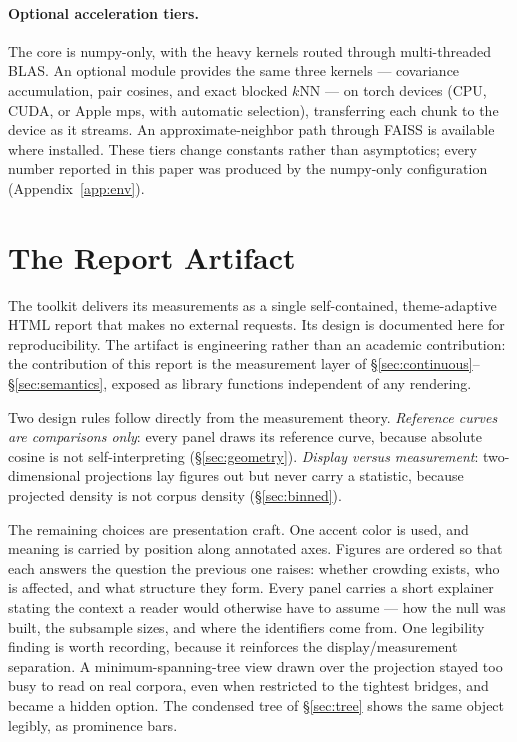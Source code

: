 \documentclass[11pt,letterpaper]{article}
\begin{document}
\paragraph{Optional acceleration tiers.}
The core is \textsf{numpy}-only, with the heavy kernels routed through
multi-threaded BLAS. An optional module provides the same three kernels
--- covariance accumulation, pair cosines, and exact blocked $k$NN --- on
\textsf{torch} devices (CPU, CUDA, or Apple \textsf{mps}, with automatic
selection), transferring each chunk to the device as it streams. An
approximate-neighbor path through FAISS is available where installed.
These tiers change constants rather than asymptotics; every number
reported in this paper was produced by the \textsf{numpy}-only
configuration (Appendix~\ref{app:env}).

\section{The Report Artifact}
\label{sec:report}

The toolkit delivers its measurements as a single self-contained,
theme-adaptive HTML report that makes no external requests. Its design is
documented here for reproducibility. The artifact is engineering rather than an
academic contribution: the contribution of this report is the measurement
layer of \S\ref{sec:continuous}--\S\ref{sec:semantics}, exposed as library
functions independent of any rendering.

Two design rules follow directly from the measurement theory.
\emph{Reference curves are comparisons only}: every panel draws its
reference curve,
because absolute cosine is not self-interpreting (\S\ref{sec:geometry}).
\emph{Display versus measurement}: two-dimensional projections lay figures
out but never carry a statistic, because projected density is not corpus
density (\S\ref{sec:binned}).

The remaining choices are presentation craft. One accent color is used,
and meaning is carried by position along annotated axes. Figures are
ordered so that each answers the question the previous one raises: whether
crowding exists, who is affected, and what structure they form. Every
panel carries a short explainer stating the context a reader would
otherwise have to assume --- how the null was built, the subsample sizes,
and where the identifiers come from. One legibility finding is worth
recording, because it reinforces the display/measurement separation. A
minimum-spanning-tree view drawn over the projection stayed too busy to
read on real corpora, even when restricted to the tightest bridges, and
became a hidden option. The condensed tree of \S\ref{sec:tree} shows the
same object legibly, as prominence bars.
\end{document}

